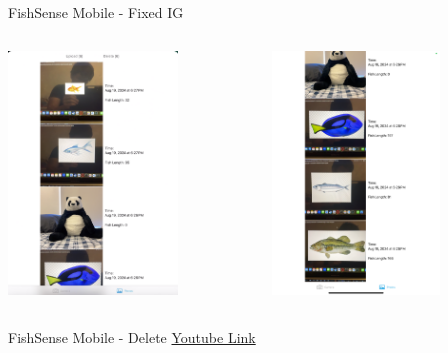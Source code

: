 \begin{frame}{FishSense Mobile - Fixed IG}
    \begin{columns}
        \begin{column}{0.5\textwidth}
            \centering
            \includegraphics[height=0.8\textheight,width=0.7\textwidth,keepaspectratio]{images/fs_ipad1.png}
        \end{column}
        \begin{column}{0.5\textwidth}
            \centering
            \includegraphics[height=0.8\textheight,width=0.7\textwidth,keepaspectratio]{images/fs_ipad2.jpeg}
        \end{column}
    \end{columns}
\end{frame}

\begin{frame}{FishSense Mobile - Delete}
    \centering
    \href{https://www.youtube.com/shorts/Q-dP97_H-QA}{Youtube Link}
\end{frame}
